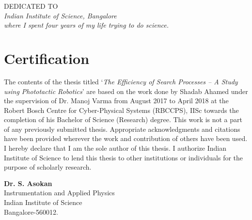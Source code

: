 \documentclass[12pt]{report}
\begin{document}
\newpage
\thispagestyle{empty}
\begin{center}

\end{center}
\newpage


\newpage
\thispagestyle{empty}
\begin{center}
\vspace*{\fill}
DEDICATED TO\\
\vspace{25pt}
\textit{Indian Institute of Science, Bangalore}\\
\textit{where I spent four years of my life trying to do science.} 

\vspace*{\fill}
\end{center}
\newpage

\newpage
\thispagestyle{empty}
\begin{center}

\end{center}
\newpage


\thispagestyle{empty}
\section*{Certification}
\vspace{4ex}
\begin{justify}
The contents of the thesis titled ‘\textit {The Efficiency of Search Processes -- A Study using Phototactic Robotics}’ are based on the work done by Shadab Ahamed under the supervision
of Dr. Manoj Varma from August 2017 to April 2018 at the Robert Bosch Centre for Cyber-Physical Systems (RBCCPS), IISc towards the completion of his Bachelor of Science (Research) degree. This work is not a part of any previously submitted thesis. Appropriate
acknowledgments and citations have been provided wherever the work and contribution of others have been used.
\\

I hereby declare that I am the sole author of this thesis. I authorize Indian Institute of Science
to lend this thesis to other institutions or individuals for the purpose of scholarly research.
\end{justify}

\vspace{21ex}
\begin{minipage}{3in}
\textbf{Dr. S. Asokan} \\ {Instrumentation and Applied Physics}\\ {Indian Institute of Science}\\
{Bangalore-560012.}
\end{minipage}
\end{document}
